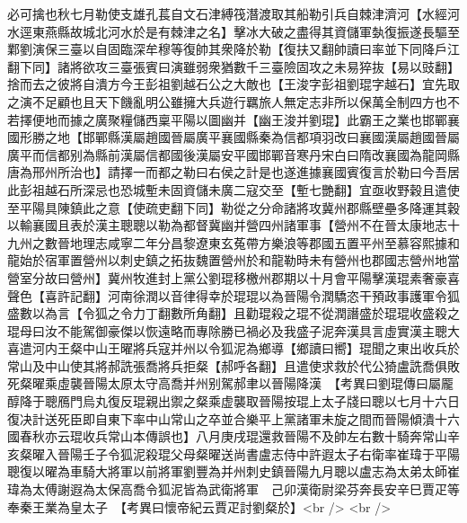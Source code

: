 必可擒也秋七月勒使支雄孔萇自文石津縛筏潛渡取其船勒引兵自棘津濟河【水經河水逕東燕縣故城北河水於是有棘津之名】擊冰大破之盡得其資儲軍埶復振遂長驅至鄴劉演保三臺以自固臨深牟穆等復帥其衆降於勒【復扶又翻帥讀曰率並下同降戶江翻下同】諸將欲攻三臺張賓曰演雖弱衆猶數千三臺險固攻之未易猝抜【易以豉翻】捨而去之彼將自潰方今王彭祖劉越石公之大敵也【王浚字彭祖劉琨字越石】宜先取之演不足顧也且天下饑亂明公雖擁大兵遊行羈旅人無定志非所以保萬全制四方也不若擇便地而據之廣聚糧儲西稟平陽以圖幽并【幽王浚并劉琨】此霸王之業也邯鄲襄國形勝之地【邯鄲縣漢屬趙國晉屬廣平襄國縣秦為信都項羽改曰襄國漢屬趙國晉屬廣平而信都别為縣前漢屬信都國後漢屬安平國邯鄲音寒丹宋白曰隋改襄國為龍岡縣唐為邢州所治也】請擇一而都之勒曰右侯之計是也遂進據襄國賓復言於勒曰今吾居此彭祖越石所深忌也恐城塹未固資儲未廣二寇交至【塹七艷翻】宜亟收野穀且遣使至平陽具陳鎮此之意【使疏吏翻下同】勒從之分命諸將攻冀州郡縣壁壘多降運其穀以輸襄國且表於漢主聰聰以勒為都督冀幽并營四州諸軍事【營州不在晉太康地志十九州之數晉地理志咸寧二年分昌黎遼東玄菟帶方樂浪等郡國五置平州至慕容熙據和龍始於宿軍置營州以刺史鎮之拓抜魏置營州於和龍勒時未有營州也郡國志營州地當營室分故曰營州】冀州牧進封上黨公劉琨移檄州郡期以十月會平陽擊漢琨素奢豪喜聲色【喜許記翻】河南徐潤以音律得幸於琨琨以為晉陽令潤驕恣干預政事護軍令狐盛數以為言【令狐之令力丁翻數所角翻】且勸琨殺之琨不從潤譖盛於琨琨收盛殺之琨母曰汝不能駕御豪傑以恢遠略而專除勝已禍必及我盛子泥奔漢具言虛實漢主聰大喜遣河内王粲中山王曜將兵寇并州以令狐泥為鄉導【鄉讀曰嚮】琨聞之東出收兵於常山及中山使其將郝詵張喬將兵拒粲【郝呼各翻】且遣使求救於代公猗盧詵喬俱敗死粲曜乘虛襲晉陽太原太守高喬并州别駕郝聿以晉陽降漢　【考異曰劉琨傳曰屬龎醇降于聰鴈門烏丸復反琨親出禦之粲乘虚襲取晉陽按琨上太子牋曰聰以七月十六日復决計送死臣即自東下率中山常山之卒並合樂平上黨諸軍未旋之間而晉陽傾潰十六國春秋亦云琨收兵常山本傳誤也】八月庚戌琨還救晉陽不及帥左右數十騎奔常山辛亥粲曜入晉陽壬子令狐泥殺琨父母粲曜送尚書盧志侍中許遐太子右衛率崔瑋于平陽聰復以曜為車騎大將軍以前將軍劉豐為并州刺史鎮晉陽九月聰以盧志為太弟太師崔瑋為太傅謝遐為太保高喬令狐泥皆為武衛將軍　己卯漢衛尉梁芬奔長安辛巳賈疋等奉秦王業為皇太子　【考異曰懷帝紀云賈疋討劉粲於】<br />
<br />
